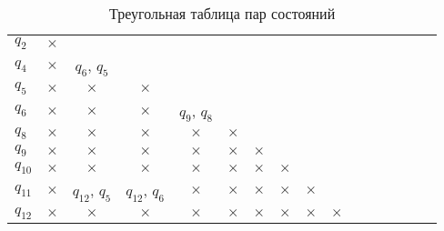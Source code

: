 \documentclass[a4paper,14pt,russian]{extarticle} %
\begin{document}
	\begin{sidewaystable}			
		\centering		
		\caption{Треугольная таблица пар состояний}	
		\renewcommand{\tabcolsep}{0.6em}	
		\label{tab:minimization_table_first} 
		\begin{tabular}{l c c c c c c c c c c c c c c c }
			\cline{2-2}
			\multicolumn{1}{l|}{\({q_{2}}\)}& \multicolumn{1}{c|}{\(\times\)} \\ \cline{2-3}
			\multicolumn{1}{l|}{\({q_{4}}\)}& \multicolumn{1}{c|}{\(\times\)} & \multicolumn{1}{c|}{\({q_{6}}\), \({q_{5}}\)} \\ \cline{2-4}
			\multicolumn{1}{l|}{\({q_{5}}\)}& \multicolumn{1}{c|}{\(\times\)} & \multicolumn{1}{c|}{\(\times\)} & \multicolumn{1}{c|}{\(\times\)} \\ \cline{2-5}
			\multicolumn{1}{l|}{\({q_{6}}\)}& \multicolumn{1}{c|}{\(\times\)} & \multicolumn{1}{c|}{\(\times\)} & \multicolumn{1}{c|}{\(\times\)} & \multicolumn{1}{c|}{\({q_{9}}\), \({q_{8}}\)} \\ \cline{2-6}
			\multicolumn{1}{l|}{\({q_{8}}\)}& \multicolumn{1}{c|}{\(\times\)} & \multicolumn{1}{c|}{\(\times\)} & \multicolumn{1}{c|}{\(\times\)} & \multicolumn{1}{c|}{\(\times\)} & \multicolumn{1}{c|}{\(\times\)} \\ \cline{2-7}
			\multicolumn{1}{l|}{\({q_{9}}\)}& \multicolumn{1}{c|}{\(\times\)} & \multicolumn{1}{c|}{\(\times\)} & \multicolumn{1}{c|}{\(\times\)} & \multicolumn{1}{c|}{\(\times\)} & \multicolumn{1}{c|}{\(\times\)} & \multicolumn{1}{c|}{\(\times\)} \\ \cline{2-8}
			\multicolumn{1}{l|}{\({q_{10}}\)}& \multicolumn{1}{c|}{\(\times\)} & \multicolumn{1}{c|}{\(\times\)} & \multicolumn{1}{c|}{\(\times\)} & \multicolumn{1}{c|}{\(\times\)} & \multicolumn{1}{c|}{\(\times\)} & \multicolumn{1}{c|}{\(\times\)} & \multicolumn{1}{c|}{\(\times\)} \\ \cline{2-9}
			\multicolumn{1}{l|}{\({q_{11}}\)}& \multicolumn{1}{c|}{\(\times\)} & \multicolumn{1}{c|}{\({q_{12}}\), \({q_{5}}\)} & \multicolumn{1}{c|}{\({q_{12}}\), \({q_{6}}\)} & \multicolumn{1}{c|}{\(\times\)} & \multicolumn{1}{c|}{\(\times\)} & \multicolumn{1}{c|}{\(\times\)} & \multicolumn{1}{c|}{\(\times\)} & \multicolumn{1}{c|}{\(\times\)} \\ \cline{2-10}
			\multicolumn{1}{l|}{\({q_{12}}\)}& \multicolumn{1}{c|}{\(\times\)} & \multicolumn{1}{c|}{\(\times\)} & \multicolumn{1}{c|}{\(\times\)} & \multicolumn{1}{c|}{\(\times\)} & \multicolumn{1}{c|}{\(\times\)} & \multicolumn{1}{c|}{\(\times\)} & \multicolumn{1}{c|}{\(\times\)} & \multicolumn{1}{c|}{\(\times\)} & \multicolumn{1}{c|}{\(\times\)} \\ \cline{2-11}

\end{tabular}
\end{sidewaystable}
\end{document}
